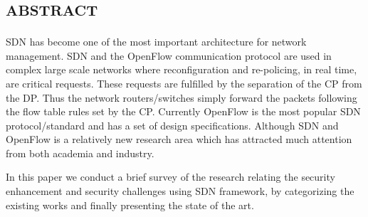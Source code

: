 %
\section*{\small \textsc{abstract}}
\ac{SDN} has become one of the most important architecture for network management. \ac{SDN} and the OpenFlow communication protocol are used in complex large scale networks where reconfiguration and re-policing, in real time, are critical requests. These requests are fulfilled by the separation of the \ac{CP} from the \ac{DP}. Thus the network routers/switches simply forward the packets following the flow table rules set by the \ac{CP}. Currently OpenFlow is the most popular \ac{SDN} protocol/standard and has a set of design specifications. Although \ac{SDN} and OpenFlow is a relatively new research area which has attracted much attention from both academia and industry.

In this paper we conduct a brief survey of the research relating the security enhancement and security challenges using \ac{SDN} framework, by categorizing the existing works and finally presenting the state of the art.